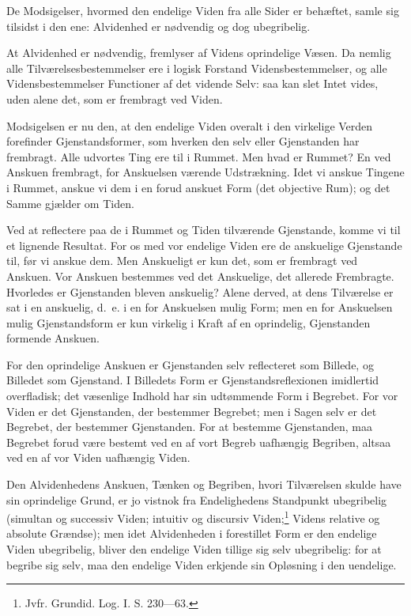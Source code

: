 \documentclass[12pt]{book}
\newcommand{\opage}[1]{\marginnote{\footnotesize\textit{[#1]}}}
\begin{document}
De Modsigelser, hvormed den endelige Viden fra alle Sider er
behæftet, samle sig tilsidst i den ene: Alvidenhed er nødvendig og
dog ubegribelig.

\opage{13} At Alvidenhed er nødvendig, fremlyser af Videns oprindelige Væsen. Da
nemlig alle Tilværelsesbestemmelser ere i logisk Forstand
Vidensbestemmelser, og alle Vidensbestemmelser Functioner af det
vidende Selv: saa kan slet Intet vides, uden alene det, som er
frembragt ved Viden.

Modsigelsen er nu den, at den endelige Viden overalt i den virkelige
Verden forefinder Gjenstandsformer, som hverken den selv eller
Gjenstanden har frembragt. Alle udvortes Ting ere til i Rummet. Men
hvad er Rummet? En ved Anskuen frembragt, for Anskuelsen værende
Udstrækning. Idet vi anskue Tingene i Rummet, anskue vi dem i en
forud anskuet Form (det objective Rum); og det Samme gjælder om
Tiden.

Ved at reflectere paa de i Rummet og Tiden tilværende Gjenstande,
komme vi til et lignende Resultat. For os med vor endelige Viden ere
de anskuelige Gjenstande til, før vi anskue dem. Men Anskueligt er
kun det, som er frembragt ved Anskuen. Vor Anskuen bestemmes ved det
Anskuelige, det allerede Frembragte. Hvorledes er Gjenstanden bleven
anskuelig? Alene derved, at dens Tilværelse er sat i en anskuelig,
d.~e. i en for Anskuelsen mulig Form; men en for Anskuelsen mulig
Gjenstandsform er kun virkelig i Kraft af en oprindelig, Gjenstanden
formende Anskuen.

For den oprindelige Anskuen er Gjenstanden selv reflecteret som
Billede, og Billedet som Gjenstand. I Billedets Form er
Gjenstandsreflexionen imidlertid overfladisk; det væsenlige Indhold
har sin udtømmende Form i Begrebet. For vor Viden er det Gjenstanden,
der bestemmer Begrebet; men i Sagen selv er det Begrebet, der
bestemmer Gjenstanden. For at bestemme Gjenstanden, maa Begrebet
forud være bestemt ved en af vort Begreb uafhængig Begriben, altsaa
ved en af vor Viden uafhængig Viden.

Den Alvidenhedens Anskuen, Tænken og Begriben, hvori Tilværelsen
skulde have sin oprindelige Grund, er jo vistnok
\opage{14} fra Endelighedens Standpunkt ubegribelig (simultan og successiv
Viden; intuitiv og discursiv Viden;\footnote{Jvfr. Grundid. Log. I.
S. 230---63.} Videns relative og absolute Grændse); men idet
Alvidenheden i forestillet Form er den endelige Viden ubegribelig,
bliver den endelige Viden tillige sig selv ubegribelig: for at
begribe sig selv, maa den endelige Viden erkjende sin Opløsning i den
uendelige.
\end{document}
